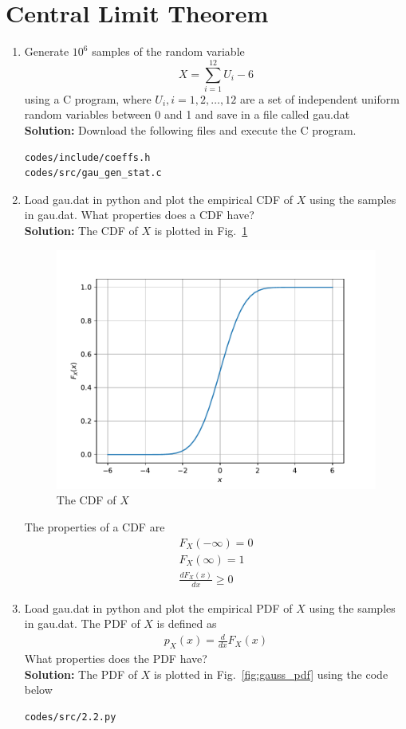 \documentclass[journal,10pt,twocolumn]{article}
\newcommand\figref{Fig.~\ref}
\newcommand{\solution}{\noindent \textbf{Solution: }}
\begin{document}
\section{Central Limit Theorem}
\begin{enumerate}
%
%
\item
Generate $10^6$ samples of the random variable
%
\begin{equation}
X = \sum_{i=1}^{12}U_i -6
\end{equation}
%
using a C program, where $U_i, i = 1,2,\dots, 12$ are  a set of independent uniform random variables between 0 and 1
and save in a file called gau.dat\\
\solution Download the following files and execute the  C program.
\begin{lstlisting}
codes/include/coeffs.h
codes/src/gau_gen_stat.c
\end{lstlisting}
%
\item
Load gau.dat in python and plot the empirical CDF of $X$ using the samples in gau.dat. What properties does a CDF have?
\\
\solution The CDF of $X$ is plotted in \figref{fig:gauss_cdf}
\begin{figure}[H]
\centering
\includegraphics[width=\columnwidth]{./chapters/ch2/figs/gau_cdf.pdf}
\caption{The CDF of $X$}
\label{fig:gauss_cdf}
\end{figure}
The properties of a CDF are
\begin{eqnarray}
	F_X(-\infty) = 0\\
	F_X(\infty) = 1\\
	\frac{dF_X(x)}{dx} \ge 0
\end{eqnarray}
\item
Load gau.dat in python and plot the empirical PDF of $X$ using the samples in gau.dat. The PDF of $X$ is defined as
\begin{align}
p_{X}(x) = \frac{d}{dx}F_{X}(x)
\label{eq:cdf_to_pdf}
\end{align}
What properties does the PDF have?
\\
\solution The PDF of $X$ is plotted in \figref{fig:gauss_pdf} using the code below
\begin{lstlisting}
codes/src/2.2.py
\end{lstlisting}


\end{enumerate}
\end{document}
